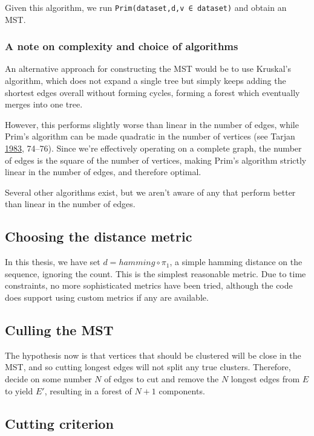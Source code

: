 \documentclass[fleqn]{book}
\begin{document}
Given this algorithm, we run \texttt{Prim(dataset,d,v\ ∈\ dataset)} and
obtain an MST.

\subsubsection{A note on complexity and choice of
algorithms}\label{a-note-on-complexity-and-choice-of-algorithms}

An alternative approach for constructing the MST would be to use
Kruskal's algorithm, which does not expand a single tree but simply
keeps adding the shortest edges overall without forming cycles, forming
a forest which eventually merges into one tree.

However, this performs slightly worse than linear in the number of
edges, while Prim's algorithm can be made quadratic in the number of
vertices (see Tarjan \protect\hyperlink{ref-tarjan1983}{1983}, 74--76).
Since we're effectively operating on a complete graph, the number of
edges is the square of the number of vertices, making Prim's algorithm
strictly linear in the number of edges, and therefore optimal.

Several other algorithms exist, but we aren't aware of any that perform
better than linear in the number of edges.

\subsection{Choosing the distance
metric}\label{choosing-the-distance-metric}

In this thesis, we have set \(d = hamming \circ \pi_1\), a simple
hamming distance on the sequence, ignoring the count. This is the
simplest reasonable metric. Due to time constraints, no more
sophisticated metrics have been tried, although the code does support
using custom metrics if any are available.

\subsection{Culling the MST}\label{culling-the-mst}

The hypothesis now is that vertices that should be clustered will be
close in the MST, and so cutting longest edges will not split any true
clusters. Therefore, decide on some number \(N\) of edges to cut and
remove the \(N\) longest edges from \(E\) to yield \(E′\), resulting in
a forest of \(N+1\) components.

\subsection{Cutting criterion}\label{cutting-criterion}
\end{document}

